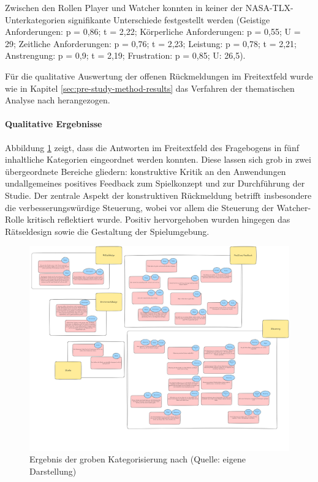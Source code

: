 Zwischen den Rollen Player und Watcher konnten in keiner der \ac{NASA-TLX}-Unterkategorien signifikante Unterschiede festgestellt werden (Geistige Anforderungen: p = 0,86; t = 2,22; Körperliche Anforderungen: p = 0,55; U = 29; Zeitliche Anforderungen: p = 0,76; t = 2,23; Leistung: p = 0,78; t = 2,21; Anstrengung: p = 0,9; t = 2,19; Frustration: p = 0,85; U: 26,5).

Für die qualitative Auswertung der offenen Rückmeldungen im Freitextfeld  wurde wie in Kapitel \ref{sec:pre-study-method-results} das Verfahren der thematischen Analyse nach \cite{braun_using_2006} herangezogen.

\paragraph{Qualitative Ergebnisse}

Abbildung \ref{fig:qualitative-results} zeigt, dass die Antworten im Freitextfeld des Fragebogens in fünf inhaltliche Kategorien eingeordnet werden konnten. Diese lassen sich grob in zwei übergeordnete Bereiche gliedern: konstruktive Kritik an den Anwendungen undallgemeines positives Feedback zum Spielkonzept und zur Durchführung der Studie. Der zentrale Aspekt der konstruktiven Rückmeldung betrifft insbesondere die verbesserungswürdige Steuerung, wobei vor allem die Steuerung der Watcher-Rolle kritisch reflektiert wurde. Positiv hervorgehoben wurden hingegen das Rätseldesign sowie die Gestaltung der Spielumgebung.

\begin{figure}[ht]
\centering
\includegraphics[width=1\linewidth]{content/pictures/Qualitative-Auswertung-Schritt-1.png}
\caption{Ergebnis der groben Kategorisierung nach \cite{braun_using_2006} (Quelle: eigene Darstellung)}
\label{fig:qualitative-results}
\end{figure}

